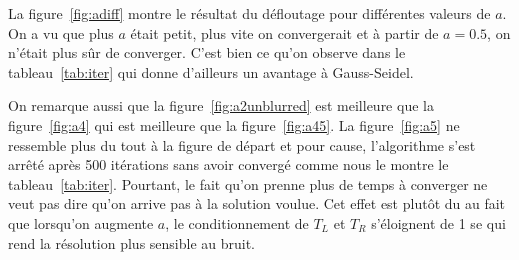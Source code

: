 La figure~\ref{fig:adiff} montre le résultat du défloutage pour différentes valeurs de $a$.
On a vu que plus $a$ était petit, plus vite on convergerait et à partir de $a = 0.5$, on n'était
plus sûr de converger.
C'est bien ce qu'on observe dans le tableau~\ref{tab:iter} qui donne d'ailleurs un avantage
à Gauss-Seidel. %

On remarque aussi que
la figure~\ref{fig:a2unblurred} est meilleure que la figure~\ref{fig:a4} qui est meilleure
que la figure~\ref{fig:a45}.
La figure~\ref{fig:a5} ne ressemble plus du tout à la figure de départ et pour cause,
l'algorithme s'est arrêté après 500 itérations sans avoir convergé comme nous le montre
le tableau~\ref{tab:iter}.
Pourtant, le fait qu'on prenne plus de temps à converger ne veut pas dire qu'on arrive
pas à la solution voulue.
Cet effet est plutôt du au fait que lorsqu'on augmente $a$, le conditionnement de $T_L$
et $T_R$ s'éloignent de 1 se qui rend la résolution plus sensible au bruit.

